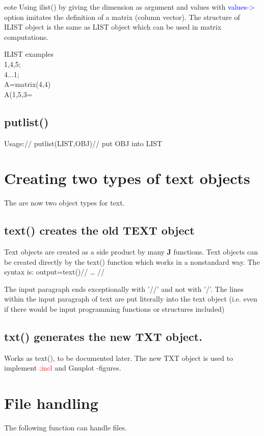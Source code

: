 \begin{note}
eote
Using \textcolor{VioletRed}{ilist}() by giving the dimension as argument and values with \textcolor{blue}{values->} option
imitates the definition of a matrix (column vector). The structure of ILIST object
is the same as LIST object which can be used in matrix computations.
\end{note}
\begin{example}[ilistex]ILIST examples\\
\label{ilistex}
{1,4,5};\\
{4...1};\\
A=\textcolor{VioletRed}{matrix}(4,4)\\
A({1,5},{3}=
\end{example}
\subsection{\textcolor{VioletRed}{putlist}()}
\label{putlist}
Usage://
\textcolor{VioletRed}{putlist}(LIST,OBJ)//
put OBJ into LIST
\section{Creating two types of text objects}
\label{texts}
The are now two object types for text.
\subsection{\textcolor{VioletRed}{text}() creates the old TEXT object}
\label{text}
Text objects are created as a side product by many \textbf{J} functions. Text objects can be created
directly by the \textcolor{VioletRed}{text}() function which works in a nonstandard way. The syntax is:
output=\textcolor{VioletRed}{text}()//
…
//

The input paragraph ends exceptionally with '//' and not with '/'. The lines within the input
paragraph of text are put literally into the text object (i.e. even if there would be input
programming functions or structures included)
\subsection{\textcolor{VioletRed}{txt}() generates the new TXT object.}
\label{txt}
Works as \textcolor{VioletRed}{text}(), to be documented later. The new TXT object is used
to implement \textcolor{Red}{;incl} and Gnuplot -figures.
\section{File handling}
\label{file}
The following function can handle files.
